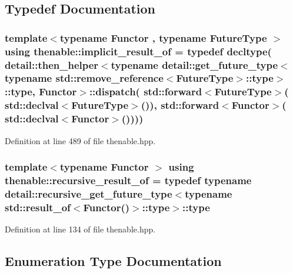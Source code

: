 \subsection{Typedef Documentation}
\subsubsection[{\texorpdfstring{implicit\+\_\+result\+\_\+of}{implicit_result_of}}]{\setlength{\rightskip}{0pt plus 5cm}template$<$typename Functor , typename Future\+Type $>$ using {\bf thenable\+::implicit\+\_\+result\+\_\+of} = typedef decltype( detail\+::then\+\_\+helper$<$typename detail\+::get\+\_\+future\+\_\+type$<$typename std\+::remove\+\_\+reference$<$Future\+Type$>$\+::type$>$\+::type, Functor$>$\+::dispatch( std\+::forward$<$Future\+Type$>$( std\+::declval$<$Future\+Type$>$()), std\+::forward$<$Functor$>$( std\+::declval$<$Functor$>$())))}\hypertarget{namespacethenable_a1ecf08d6ad8b8688d7b4df047b5feaae}{}\label{namespacethenable_a1ecf08d6ad8b8688d7b4df047b5feaae}


Definition at line 489 of file thenable.\+hpp.

\subsubsection[{\texorpdfstring{recursive\+\_\+result\+\_\+of}{recursive_result_of}}]{\setlength{\rightskip}{0pt plus 5cm}template$<$typename Functor $>$ using {\bf thenable\+::recursive\+\_\+result\+\_\+of} = typedef typename detail\+::recursive\+\_\+get\+\_\+future\+\_\+type$<$typename std\+::result\+\_\+of$<$Functor()$>$\+::type$>$\+::type}\hypertarget{namespacethenable_ae5c96f83512d34d52e355cacdec0eb02}{}\label{namespacethenable_ae5c96f83512d34d52e355cacdec0eb02}


Definition at line 134 of file thenable.\+hpp.



\subsection{Enumeration Type Documentation}
